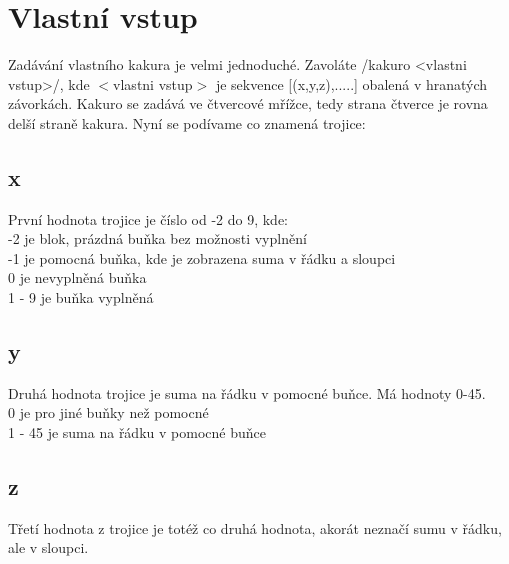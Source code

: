 \section*{Vlastní vstup}
Zadávání vlastního kakura je velmi jednoduché. 
Zavoláte \haskellline/kakuro <vlastni vstup>/, 
kde $<$vlastni vstup$>$ je sekvence [(x,y,z),.....] obalená v hranatých závorkách.
Kakuro se zadává ve čtvercové mřížce, tedy strana čtverce je rovna delší straně kakura.
Nyní se podívame co znamená trojice:
\subsection*{x}
První hodnota trojice je číslo od -2 do 9, kde:\\
-2 je blok, prázdná buňka bez možnosti vyplnění\\
-1 je pomocná buňka, kde je zobrazena suma v řádku a sloupci\\
0 je nevyplněná buňka\\
1 - 9 je buňka vyplněná

\subsection*{y}
Druhá hodnota trojice je suma na řádku v pomocné buňce.
Má hodnoty 0-45.\\
0 je pro jiné buňky než pomocné\\
1 - 45 je suma na řádku v pomocné buňce

\subsection*{z}
Třetí hodnota z trojice je totéž co druhá hodnota, akorát neznačí sumu v řádku, ale v sloupci.

